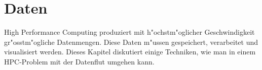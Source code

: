 \chapter{Daten}
High Performance Computing produziert mit h"ochstm"oglicher Geschwindigkeit
gr"osstm"ogliche Datenmengen. Diese Daten m"ussen gespeichert, verarbeitet
und visualisiert werden.
Dieses Kapitel diskutiert einige Techniken, wie man in einem HPC-Problem
mit der Datenflut umgehen kann.

